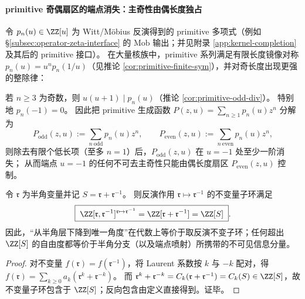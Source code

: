 \paragraph{primitive 奇偶扇区的端点消失：主奇性由偶长度独占}
令 \(p_n(u)\in\ZZ[u]\) 为 Witt/Möbius 反演得到的 primitive 多项式（例如 \S\ref{subsec:operator-zeta-interface} 的 \(\mathrm{Mob}\) 输出；并见附录 \ref{app:kernel-completion} 及其后的 primitive 接口）。
在大量核族中，primitive 系列满足有限长度镜像对称 \(p_n(u)=u^n p_n(1/u)\)（见推论 \ref{cor:primitive-finite-sym}），并对奇长度出现更强的整除律：

\begin{corollary}\label{cor:primitive-odd-vanish-u-minus1}
若 \(n\ge 3\) 为奇数，则 \(u(u+1)\mid p_n(u)\)（推论 \ref{cor:primitive-odd-div}）。
特别地 \(p_n(-1)=0\)。
因此把 primitive 生成函数 \(P(z,u)=\sum_{n\ge 1}p_n(u)z^n\) 分解为
\[
P_{\mathrm{odd}}(z,u):=\sum_{n\ \mathrm{odd}}p_n(u)z^n,\qquad
P_{\mathrm{even}}(z,u):=\sum_{n\ \mathrm{even}}p_n(u)z^n,
\]
则除去有限个低长项（至多 \(n=1\)）后，\(P_{\mathrm{odd}}(z,u)\) 在 \(u=-1\) 处至少一阶消失；
从而端点 \(u=-1\) 的任何不可去主奇性只能由偶长度扇区 \(P_{\mathrm{even}}(z,u)\) 控制。
\end{corollary}

\begin{proposition}\label{prop:completion-subring-unique-angle}
令 \(\mathfrak{r}\) 为半角变量并记 \(S=\mathfrak{r}+\mathfrak{r}^{-1}\)。
则反演作用 \(\mathfrak{r}\mapsto \mathfrak{r}^{-1}\) 的不变量子环满足
\[
\boxed{\;\ZZ[\mathfrak{r},\mathfrak{r}^{-1}]^{\mathfrak{r}\mapsto \mathfrak{r}^{-1}}
=\ZZ[\mathfrak{r}+\mathfrak{r}^{-1}]
=\ZZ[S]\; }.
\]
因此，“从半角层下降到唯一角度”在代数上等价于取反演不变子环；任何超出 \(\ZZ[S]\) 的自由度都等价于半角分支（以及端点喷射）所携带的不可见信息分量。
\end{proposition}
\begin{proof}
对不变量 \(f(\mathfrak{r})=f(\mathfrak{r}^{-1})\)，将 Laurent 系数按 \(k\) 与 \(-k\) 配对，得
\(
f(\mathfrak{r})=\sum_{k\ge 0}a_k(\mathfrak{r}^k+\mathfrak{r}^{-k})
\)。
而 \(\mathfrak{r}^k+\mathfrak{r}^{-k}=C_k(\mathfrak{r}+\mathfrak{r}^{-1})=C_k(S)\in\ZZ[S]\)，故不变量子环包含于 \(\ZZ[S]\)；反向包含由定义直接得到。证毕。
\end{proof}

